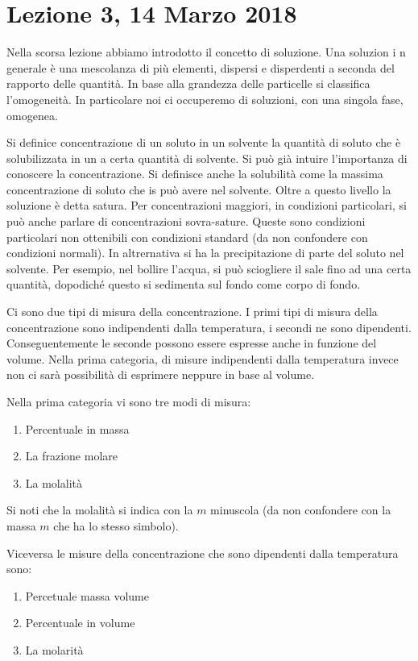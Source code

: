 \documentclass[../AppuntiChimica]{subfiles}
\begin{document}
	\section{Lezione 3, 14 Marzo 2018}
	Nella scorsa lezione abbiamo introdotto il concetto di soluzione. Una soluzion i n generale è una mescolanza di più elementi, dispersi e disperdenti a seconda del rapporto delle quantità. In base alla grandezza delle particelle si classifica l'omogeneità. In particolare noi ci occuperemo di soluzioni, con una singola fase, omogenea.
	
	Si definice concentrazione di un soluto in un solvente la quantità di soluto che è solubilizzata in un a certa quantità di solvente. Si può già intuire l'importanza di conoscere la concentrazione. Si definisce anche la solubilità come la massima concentrazione di soluto che is può avere nel solvente. Oltre a questo livello la soluzione è detta satura. Per concentrazioni maggiori, in condizioni particolari, si può anche parlare di concentrazioni sovra-sature. Queste sono condizioni particolari non ottenibili con condizioni standard (da non confondere con condizioni normali). In altrernativa si ha la precipitazione di parte del soluto nel solvente. Per esempio, nel bollire l'acqua, si può sciogliere il sale fino ad una certa quantità, dopodiché questo si sedimenta sul fondo come corpo di fondo. 
	
	Ci sono due tipi di misura della concentrazione. I primi tipi di misura della concentrazione sono indipendenti dalla temperatura, i secondi ne sono dipendenti. Conseguentemente le seconde possono essere espresse anche in funzione del volume. Nella prima categoria, di misure indipendenti dalla temperatura invece non ci sarà possibilità di esprimere neppure in base al volume.
	
	Nella prima categoria vi sono tre modi di misura:
	\begin{enumerate}
		\item Percentuale in massa 
		\item La frazione molare
		\item La molalità
	\end{enumerate}
	Si noti che la molalità si indica con la $ m $ minuscola (da non confondere con la massa $ m $ che ha lo stesso simbolo).
	
	Viceversa le misure della concentrazione che sono dipendenti dalla temperatura sono:
	\begin{enumerate}
		\item Percetuale massa volume
		\item Percentuale in volume
		\item La molarità
	\end{enumerate}
	
\end{document}
